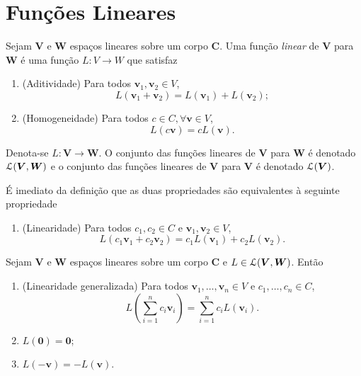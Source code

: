 \section{Funções Lineares}

\begin{defi}
Sejam $\bm V$ e $\bm W$ espaços lineares sobre um corpo $\bm C$. Uma função \emph{linear} de $\bm V$ para $\bm W$ é uma função $L\colon V \to W$ que satisfaz
	\begin{enumerate}
	\item (Aditividade) Para todos $\bm v_1,\bm v_2 \in V$,
		\begin{equation*}
		L(\bm v_1 + \bm v_2) = L(\bm v_1)+L(\bm v_2);
		\end{equation*}
	\item (Homogeneidade) Para todos $c \in C, \forall \bm v \in V$,
		\begin{equation*}
		 L(c\bm v)=cL(\bm v).
		\end{equation*}
	\end{enumerate}
Denota-se $L\colon \bm V \to \bm W$. O conjunto das funções lineares de $\bm V$ para $\bm W$ é denotado $\mathcal{L}(\bm V,\bm W)$ e o conjunto das funções lineares de $\bm V$ para $\bm V$ é denotado $\mathcal{L}(\bm V)$.
\end{defi}

	É imediato da definição que as duas propriedades são equivalentes à seguinte propriedade
	\begin{enumerate}
	\item (Linearidade) Para todos $c_1,c_2 \in C$ e $\bm v_1,\bm v_2 \in V$,
		\begin{equation*}
		L(c_1\bm v_1 + c_2\bm v_2) = c_1L(\bm v_1)+c_2L(\bm v_2).
		\end{equation*}
	\end{enumerate}

\begin{prop}
Sejam $\bm V$ e $\bm W$ espaços lineares sobre um corpo $\bm C$ e $L \in \mathcal{L}(\bm V,\bm W)$. Então
	\begin{enumerate}
	\item (Linearidade generalizada) Para todos $\bm v_1,\ldots,\bm v_n \in V$ e $c_1,\ldots,c_n \in C$,
	\begin{equation*}
	L\left(\sum_{i=1}^n c_i \bm v_i \right) = \sum_{i=1}^n c_i L(\bm v_i).
	\end{equation*}

	\item $L(\bm 0) = \bm 0$;

	\item $L(-\bm v)=-L(\bm v)$.
\end{enumerate}
\end{prop}

